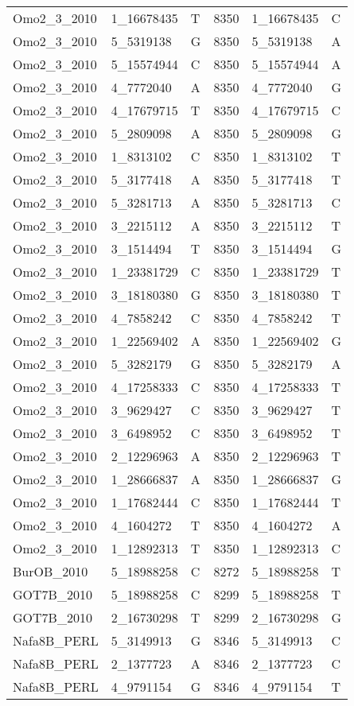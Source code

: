 \begin{center}
\begin{longtable}{|l|l|l|l|l|l|}
Omo2\_3\_2010&1\_16678435&T&8350&1\_16678435&C\\
Omo2\_3\_2010&5\_5319138&G&8350&5\_5319138&A\\
Omo2\_3\_2010&5\_15574944&C&8350&5\_15574944&A\\
Omo2\_3\_2010&4\_7772040&A&8350&4\_7772040&G\\
Omo2\_3\_2010&4\_17679715&T&8350&4\_17679715&C\\
Omo2\_3\_2010&5\_2809098&A&8350&5\_2809098&G\\
Omo2\_3\_2010&1\_8313102&C&8350&1\_8313102&T\\
Omo2\_3\_2010&5\_3177418&A&8350&5\_3177418&T\\
Omo2\_3\_2010&5\_3281713&A&8350&5\_3281713&C\\
Omo2\_3\_2010&3\_2215112&A&8350&3\_2215112&T\\
Omo2\_3\_2010&3\_1514494&T&8350&3\_1514494&G\\
Omo2\_3\_2010&1\_23381729&C&8350&1\_23381729&T\\
Omo2\_3\_2010&3\_18180380&G&8350&3\_18180380&T\\
Omo2\_3\_2010&4\_7858242&C&8350&4\_7858242&T\\
Omo2\_3\_2010&1\_22569402&A&8350&1\_22569402&G\\
Omo2\_3\_2010&5\_3282179&G&8350&5\_3282179&A\\
Omo2\_3\_2010&4\_17258333&C&8350&4\_17258333&T\\
Omo2\_3\_2010&3\_9629427&C&8350&3\_9629427&T\\
Omo2\_3\_2010&3\_6498952&C&8350&3\_6498952&T\\
Omo2\_3\_2010&2\_12296963&A&8350&2\_12296963&T\\
Omo2\_3\_2010&1\_28666837&A&8350&1\_28666837&G\\
Omo2\_3\_2010&1\_17682444&C&8350&1\_17682444&T\\
Omo2\_3\_2010&4\_1604272&T&8350&4\_1604272&A\\
Omo2\_3\_2010&1\_12892313&T&8350&1\_12892313&C\\
BurOB\_2010&5\_18988258&C&8272&5\_18988258&T\\
GOT7B\_2010&5\_18988258&C&8299&5\_18988258&T\\
GOT7B\_2010&2\_16730298&T&8299&2\_16730298&G\\
Nafa8B\_PERL&5\_3149913&G&8346&5\_3149913&C\\
Nafa8B\_PERL&2\_1377723&A&8346&2\_1377723&C\\
Nafa8B\_PERL&4\_9791154&G&8346&4\_9791154&T\\

\end{longtable}
\end{center}
